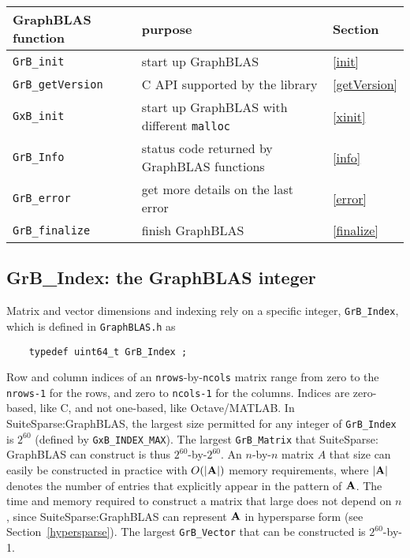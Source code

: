 \documentclass[12pt]{article}
\begin{document}
\vspace{0.2in}
{\footnotesize
\begin{tabular}{lll}
\hline
GraphBLAS function   & purpose                                      & Section \\
\hline
\verb'GrB_init'      & start up GraphBLAS                           & \ref{init} \\
\verb'GrB_getVersion'& C API supported by the library               & \ref{getVersion} \\
\verb'GxB_init'      & start up GraphBLAS with different \verb'malloc' & \ref{xinit} \\
\verb'GrB_Info'      & status code returned by GraphBLAS functions  & \ref{info} \\
\verb'GrB_error'     & get more details on the last error           & \ref{error} \\
\verb'GrB_finalize'  & finish GraphBLAS                             & \ref{finalize} \\
\hline
\end{tabular}
}
\vspace{0.2in}

\subsection{{\sf GrB\_Index:} the GraphBLAS integer} %
\label{grbindex}

Matrix and vector dimensions and indexing rely on a specific integer,
\verb'GrB_Index', which is defined in \verb'GraphBLAS.h' as

    {\footnotesize
    \begin{verbatim}
    typedef uint64_t GrB_Index ; \end{verbatim}}

Row and column indices of an \verb'nrows'-by-\verb'ncols' matrix range from
zero to the \verb'nrows-1' for the rows, and zero to \verb'ncols-1' for the
columns.  Indices are zero-based, like C, and not one-based, like
Octave/MATLAB.  In SuiteSparse:GraphBLAS, the largest size permitted for any
integer of \verb'GrB_Index' is $2^{60}$ (defined by \verb'GxB_INDEX_MAX').
The largest \verb'GrB_Matrix' that
SuiteSparse: GraphBLAS can construct is thus $2^{60}$-by-$2^{60}$.  An
$n$-by-$n$ matrix $A$ that size can easily be constructed in practice with
$O(|{\bf A}|)$ memory requirements, where $|{\bf A}|$ denotes the number of
entries that explicitly appear in the pattern of ${\bf A}$.  The time and
memory required to construct a matrix that large does not depend on $n$, since
SuiteSparse:GraphBLAS can represent ${\bf A}$ in hypersparse form (see
Section~\ref{hypersparse}).  The largest \verb'GrB_Vector' that can be
constructed is $2^{60}$-by-1.
\end{document}
